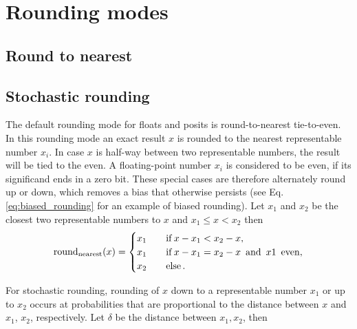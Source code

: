 

\section{Rounding modes}
\label{sec:rounding}

\subsection{Round to nearest}
\label{sec:roundnearest}

	\subsection{Stochastic rounding}
	\label{sec:stochastic_rounding} 

The default rounding mode for floats and posits is round-to-nearest tie-to-even. In this rounding mode an exact result $x$ is rounded
to the nearest representable number $x_i$. In case $x$ is half-way between two representable numbers, the result will be tied to the
even. A floating-point number $x_i$ is considered to be even, if its significand ends in a zero bit. These special cases are therefore
alternately round up or down, which removes a bias that otherwise persists (see Eq. \ref{eq:biased_rounding} for an example of biased rounding).
Let $x_1$ and $x_2$ be the closest two representable numbers to $x$ and $x_1 \leq x < x_2$ then
\begin{equation}
\operatorname{round}_{\operatorname{nearest}}(x) =
\begin{cases}
x_1 \quad &\operatorname{if} x - x_1 < x_2 - x,  \\
x_1 &\operatorname{if} x-x_1 = x_2 - x \operatorname{~and~} x1 \operatorname{~even}, \\
x_2 &\operatorname{else}.
\end{cases}
\label{eq:roundnearest}
\end{equation}

For stochastic rounding, rounding of $x$ down to a representable number $x_1$ or up to $x_2$ occurs at probabilities that are proportional
to the distance between $x$ and $x_1$, $x_2$, respectively. Let $\delta$ be the distance between $x_1,x_2$, then

